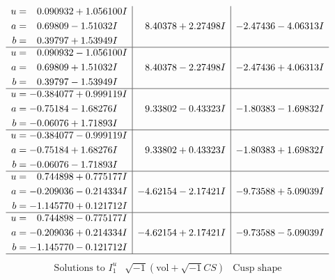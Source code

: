 \documentclass[1p]{elsarticle_modified}
\theoremstyle{definition}
\newcommand{\I}{\sqrt{-1}}
\begin{document}
$$\begin{array}{c|c|c}
\begin{aligned}
u &= \phantom{-}0.090932 + 1.056100 I \\
a &= \phantom{-}0.69809 - 1.51032 I \\
b &= \phantom{-}0.39797 + 1.53949 I\end{aligned}
 & \phantom{-}8.40378 + 2.27498 I & -2.47436 - 4.06313 I \\ \hline\begin{aligned}
u &= \phantom{-}0.090932 - 1.056100 I \\
a &= \phantom{-}0.69809 + 1.51032 I \\
b &= \phantom{-}0.39797 - 1.53949 I\end{aligned}
 & \phantom{-}8.40378 - 2.27498 I & -2.47436 + 4.06313 I \\ \hline\begin{aligned}
u &= -0.384077 + 0.999119 I \\
a &= -0.75184 - 1.68276 I \\
b &= -0.06076 + 1.71893 I\end{aligned}
 & \phantom{-}9.33802 - 0.43323 I & -1.80383 - 1.69832 I \\ \hline\begin{aligned}
u &= -0.384077 - 0.999119 I \\
a &= -0.75184 + 1.68276 I \\
b &= -0.06076 - 1.71893 I\end{aligned}
 & \phantom{-}9.33802 + 0.43323 I & -1.80383 + 1.69832 I \\ \hline\begin{aligned}
u &= \phantom{-}0.744898 + 0.775177 I \\
a &= -0.209036 - 0.214334 I \\
b &= -1.145770 + 0.121712 I\end{aligned}
 & -4.62154 - 2.17421 I & -9.73588 + 5.09039 I \\ \hline\begin{aligned}
u &= \phantom{-}0.744898 - 0.775177 I \\
a &= -0.209036 + 0.214334 I \\
b &= -1.145770 - 0.121712 I\end{aligned}
 & -4.62154 + 2.17421 I & -9.73588 - 5.09039 I\\
 \hline 
 \end{array}$$\newpage$$\begin{array}{c|c|c}  
\text{Solutions to }I^u_{1}& \I (\text{vol} + \sqrt{-1}CS) & \text{Cusp shape}\\
 \hline 
\begin{aligned}

\end{aligned}
\end{array}$$
\end{document}

